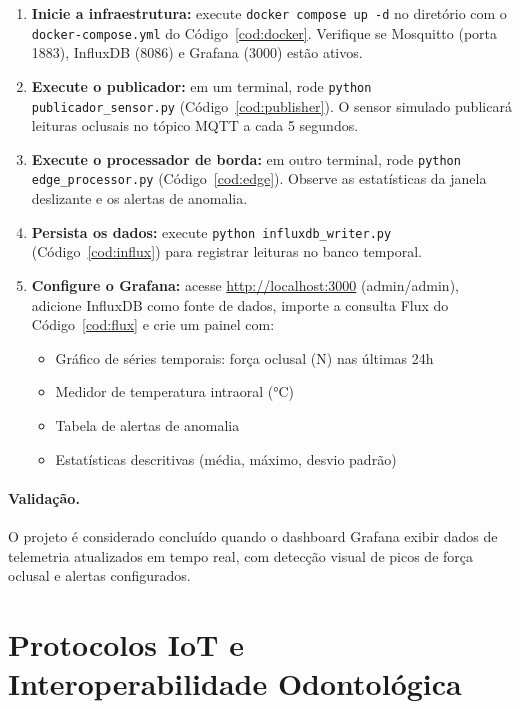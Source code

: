 \begin{enumerate}
    \item \textbf{Inicie a infraestrutura:} execute \texttt{docker compose up -d} no diretório com o \texttt{docker-compose.yml} do Código~\ref{cod:docker}. Verifique se Mosquitto (porta 1883), InfluxDB (8086) e Grafana (3000) estão ativos.
    \item \textbf{Execute o publicador:} em um terminal, rode \texttt{python publicador\_sensor.py} (Código~\ref{cod:publisher}). O sensor simulado publicará leituras oclusais no tópico MQTT a cada 5 segundos.
    \item \textbf{Execute o processador de borda:} em outro terminal, rode \texttt{python edge\_processor.py} (Código~\ref{cod:edge}). Observe as estatísticas da janela deslizante e os alertas de anomalia.
    \item \textbf{Persista os dados:} execute \texttt{python influxdb\_writer.py} (Código~\ref{cod:influx}) para registrar leituras no banco temporal.
    \item \textbf{Configure o Grafana:} acesse \url{http://localhost:3000} (admin/admin), adicione InfluxDB como fonte de dados, importe a consulta Flux do Código~\ref{cod:flux} e crie um painel com:
    \begin{itemize}
        \item Gráfico de séries temporais: força oclusal (N) nas últimas 24h
        \item Medidor de temperatura intraoral (°C)
        \item Tabela de alertas de anomalia
        \item Estatísticas descritivas (média, máximo, desvio padrão)
    \end{itemize}
\end{enumerate}

\paragraph{Validação.} O projeto é considerado concluído quando o dashboard Grafana exibir dados de telemetria atualizados em tempo real, com detecção visual de picos de força oclusal e alertas configurados.

\section{Protocolos IoT e Interoperabilidade Odontológica}

